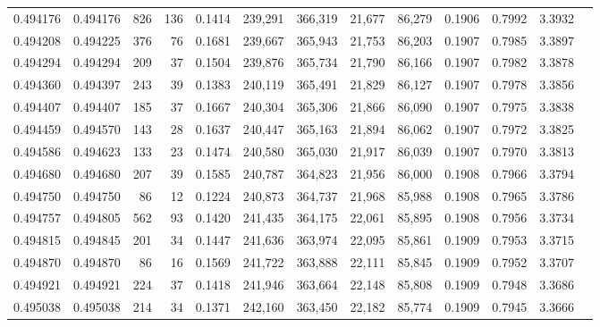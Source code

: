 \begin{tabular}{rrrrrrrrrrrrr}
0.494176 & 0.494176 &   826 &   136 &                                     0.1414 & 239,291 & 366,319 &  21,677 &  86,279 & 0.1906 & 0.7992 & 3.3932 \\
0.494208 & 0.494225 &   376 &    76 &                                     0.1681 & 239,667 & 365,943 &  21,753 &  86,203 & 0.1907 & 0.7985 & 3.3897 \\
0.494294 & 0.494294 &   209 &    37 &                                     0.1504 & 239,876 & 365,734 &  21,790 &  86,166 & 0.1907 & 0.7982 & 3.3878 \\
0.494360 & 0.494397 &   243 &    39 &                                     0.1383 & 240,119 & 365,491 &  21,829 &  86,127 & 0.1907 & 0.7978 & 3.3856 \\
0.494407 & 0.494407 &   185 &    37 &                                     0.1667 & 240,304 & 365,306 &  21,866 &  86,090 & 0.1907 & 0.7975 & 3.3838 \\
0.494459 & 0.494570 &   143 &    28 &                                     0.1637 & 240,447 & 365,163 &  21,894 &  86,062 & 0.1907 & 0.7972 & 3.3825 \\
0.494586 & 0.494623 &   133 &    23 &                                     0.1474 & 240,580 & 365,030 &  21,917 &  86,039 & 0.1907 & 0.7970 & 3.3813 \\
0.494680 & 0.494680 &   207 &    39 &                                     0.1585 & 240,787 & 364,823 &  21,956 &  86,000 & 0.1908 & 0.7966 & 3.3794 \\
0.494750 & 0.494750 &    86 &    12 &                                     0.1224 & 240,873 & 364,737 &  21,968 &  85,988 & 0.1908 & 0.7965 & 3.3786 \\
0.494757 & 0.494805 &   562 &    93 &                                     0.1420 & 241,435 & 364,175 &  22,061 &  85,895 & 0.1908 & 0.7956 & 3.3734 \\
0.494815 & 0.494845 &   201 &    34 &                                     0.1447 & 241,636 & 363,974 &  22,095 &  85,861 & 0.1909 & 0.7953 & 3.3715 \\
0.494870 & 0.494870 &    86 &    16 &                                     0.1569 & 241,722 & 363,888 &  22,111 &  85,845 & 0.1909 & 0.7952 & 3.3707 \\
0.494921 & 0.494921 &   224 &    37 &                                     0.1418 & 241,946 & 363,664 &  22,148 &  85,808 & 0.1909 & 0.7948 & 3.3686 \\
0.495038 & 0.495038 &   214 &    34 &                                     0.1371 & 242,160 & 363,450 &  22,182 &  85,774 & 0.1909 & 0.7945 & 3.3666 \\

\end{tabular}

